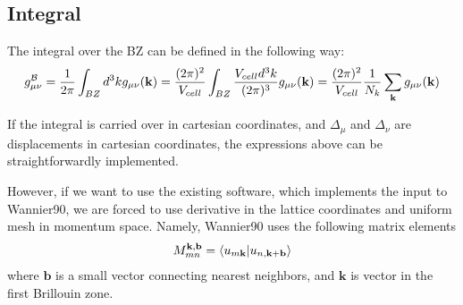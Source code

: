 \documentclass[onecolumn, prb,preprintnumbers,amsmath,amssymb,floatfix]{revtex4}
\newcommand{\vk}{{\mathbf{k}}}
\newcommand{\vb}{{\mathbf{b}}}
\newcommand{\cb}{{\cal B}}
\begin{document}
\newpage
\subsection{Integral}

The integral over the BZ can  be defined in the following way:
\begin{eqnarray}
  g_{\mu\nu}^\cb=\frac{1}{2\pi}\int_{BZ} d^3k g_{\mu\nu}(\vk)  =
  \frac{(2\pi)^2}{V_{cell}} \int_{BZ}\frac{V_{cell} d^3k}{(2\pi)^3} g_{\mu\nu}(\vk) 
=\frac{(2\pi)^2}{V_{cell}} \frac{1}{N_k} \sum_{\vk}g_{\mu\nu}(\vk) 
\end{eqnarray}  

If the integral is carried over in cartesian coordinates, and
$\Delta_\mu$ and $\Delta_\nu$ are displacements in cartesian
coordinates, the expressions above can be straightforwardly
implemented.

However, if we want to use the existing software, which implements the
input to Wannier90, we are forced to use derivative in the lattice
coordinates and uniform mesh in momentum space. Namely, Wannier90 uses
the following matrix elements
\begin{eqnarray}
M_{mn}^{\vk,\vb}=  \braket{u_{m\vk}|u_{n,\vk+\vb}}
\end{eqnarray}  
where $\vb$ is a small vector connecting nearest neighbors, and $\vk$
is vector in the first Brillouin zone.
\end{document}
